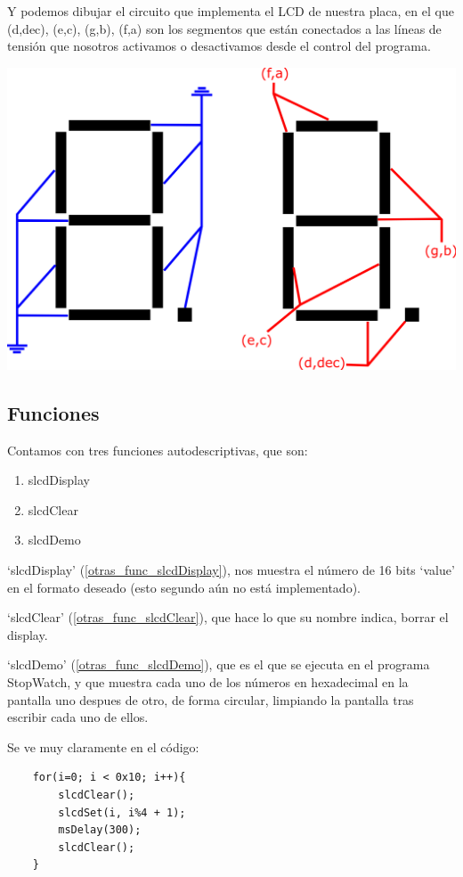 \documentclass[a4paper,openright,12pt]{article}
\begin{document}
Y podemos dibujar el circuito que implementa el LCD de nuestra placa, en el que (d,dec), (e,c), (g,b), (f,a) son los segmentos que están conectados a las líneas de
tensión que nosotros activamos o desactivamos desde el control del programa.
\begin{center}
\includegraphics[scale=0.5]{img/digits.png}
\end{center}

\subsection{Funciones}
Contamos con tres funciones autodescriptivas, que son:
\begin{enumerate}[a]
    \item slcdDisplay   \label{otras_func_slcdDisplay}
    \item slcdClear     \label{otras_func_slcdClear}
    \item slcdDemo      \label{otras_func_slcdDemo}
\end{enumerate}


`slcdDisplay' (\ref{otras_func_slcdDisplay}), nos muestra el número de 16 bits `value' en el formato deseado (esto segundo aún no está implementado).

`slcdClear' (\ref{otras_func_slcdClear}), que hace lo que su nombre indica, borrar el display.

`slcdDemo' (\ref{otras_func_slcdDemo}), que es el que se ejecuta en el programa StopWatch, y que muestra cada uno de los números en hexadecimal en la pantalla uno
despues de otro, de forma circular, limpiando la pantalla tras escribir cada uno de ellos.

Se ve muy claramente en el código:
\begin{verbatim}
    for(i=0; i < 0x10; i++){
        slcdClear();
        slcdSet(i, i%4 + 1);
        msDelay(300);
        slcdClear();
    }   
\end{verbatim}
\end{document}
